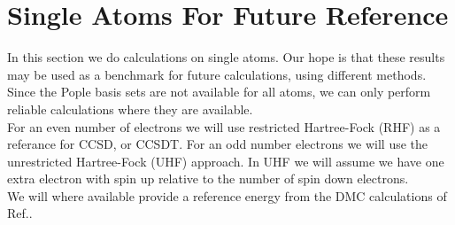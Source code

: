 \section{Single Atoms For Future Reference}
In this section we do calculations on single atoms. Our hope is that
these results may be used as a benchmark for future calculations,
using different methods. Since the Pople basis sets are not available for
all atoms, we can only perform reliable calculations where they are
available. \\

For an even number of electrons we will use restricted Hartree-Fock (RHF) as a referance for CCSD, or
CCSDT. For an odd number electrons we will use the unrestricted Hartree-Fock (UHF) approach. In UHF we will assume
we have one extra electron with spin up relative to the number of
spin down electrons. \\

We will where available provide a reference energy from the DMC calculations of Ref.\cite{dmc_jorgens_resultater_master}. 

